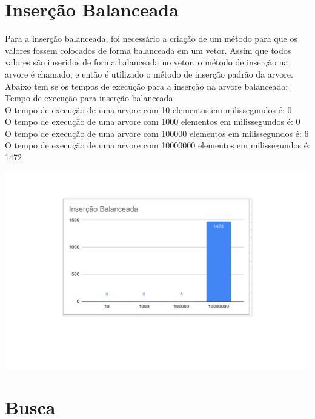 \section{Inserção Balanceada}

Para a inserção balanceada, foi necessário a criação de um método para que os valores fossem colocados de forma balanceada em um vetor. Assim que todos valores são inseridos de forma balanceada no vetor, o método de inserção na arvore é chamado, e então é utilizado o método de inserção padrão da arvore. Abaixo tem se os tempos de execução para a inserção na arvore balanceada:\\
Tempo de execução para inserção balanceada:\\
O tempo de execução de uma arvore com 10 elementos em milissegundos é: 0\\
O tempo de execução de uma arvore com 1000 elementos em milissegundos é: 0\\
O tempo de execução de uma arvore com 100000 elementos em milissegundos é: 6\\
O tempo de execução de uma arvore com 10000000 elementos em milissegundos é: 1472
    \begin{center}
            \includegraphics[scale=0.8]{Trabalho AED/fig/grafico4.pdf}
            \label{fig:Grafico 4}
    \end{center}
\pagebreak
\section{Busca}

